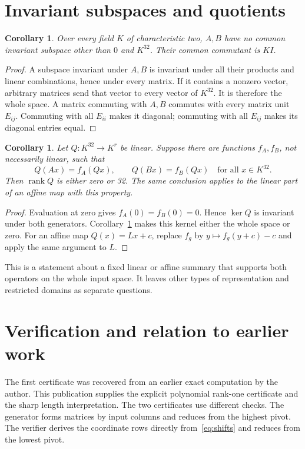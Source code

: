 \documentclass[11pt,a4paper]{article}
\newtheorem{corollary}[theorem]{Corollary}
\theoremstyle{definition}\newtheorem{definition}[theorem]{Definition}
\DeclareMathOperator{\rank}{rank}
\begin{document}
\section{Invariant subspaces and quotients}
\begin{corollary}\label{cor:invariant}
Over every field $K$ of characteristic two, $A,B$ have no common invariant
subspace other than $0$ and $K^{32}$. Their common commutant is $K I$.
\end{corollary}
\begin{proof}
A subspace invariant under $A,B$ is invariant under all their products
and linear combinations, hence under every matrix. If it contains a
nonzero vector, arbitrary matrices send that vector to every vector of
$K^{32}$. It is therefore the whole space.
A matrix commuting with $A,B$ commutes with every matrix unit $E_{ij}$.
Commuting with all $E_{ii}$ makes it diagonal; commuting with all $E_{ij}$
makes its diagonal entries equal.
\end{proof}

\begin{corollary}\label{cor:quotient}
Let $Q:K^{32}\to K^r$ be linear. Suppose there are functions $f_A,f_B$,
not necessarily linear, such that
\[
 Q(Ax)=f_A(Qx),\qquad Q(Bx)=f_B(Qx)\quad\text{for all }x\in K^{32}.
\]
Then $\rank Q$ is either zero or 32. The same conclusion applies to the
linear part of an affine map with this property.
\end{corollary}
\begin{proof}
Evaluation at zero gives $f_A(0)=f_B(0)=0$. Hence $\ker Q$ is invariant
under both generators. Corollary~\ref{cor:invariant} makes this kernel
either the whole space or zero. For an affine map $Q(x)=Lx+c$, replace
$f_g$ by $y\mapsto f_g(y+c)-c$ and apply the same argument to $L$.
\end{proof}
This is a statement about a fixed linear or affine summary that supports
both operators on the whole input space. It leaves other types of
representation and restricted domains as separate questions.

\section{Verification and relation to earlier work}
The first certificate was recovered from an earlier exact computation by
the author. This publication supplies the explicit polynomial rank-one
certificate and the sharp length interpretation. The two certificates
use different checks. The generator forms matrices by input columns and
reduces from the highest pivot. The verifier derives the coordinate rows
directly from~\eqref{eq:shifts} and reduces from the lowest pivot.
\end{document}
